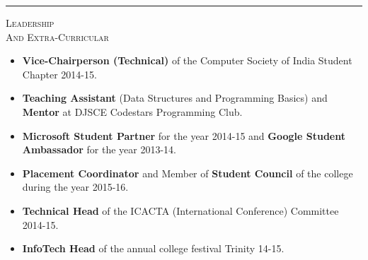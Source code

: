 \documentclass[11pt,a4paper]{article}
\newcommand{\bspace}{\vspace{4.0mm}} %
\begin{document}
	\bspace
	\hrule
	\bspace
	
	\begin{minipage}[t]{0.2\textwidth}
		\textsc{Leadership\\And Extra-Curricular} 
	\end{minipage}
	\begin{minipage}[t]{0.8\textwidth}
		\justify
		\begin{itemize}[noitemsep, leftmargin=*]
			\item \textbf{Vice-Chairperson (Technical)} of the Computer Society of India Student Chapter 2014-15.
			\item \textbf{Teaching Assistant} (Data Structures and Programming Basics) and \textbf{Mentor} at DJSCE Codestars Programming Club.
			\item \textbf{Microsoft Student Partner} for the year 2014-15 and \textbf{Google Student Ambassador} for the year 2013-14.
			\item \textbf{Placement Coordinator} and Member of \textbf{Student Council} of the college during the year 2015-16.
			\item \textbf{Technical Head} of the ICACTA (International Conference) Committee 2014-15.
			\item \textbf{InfoTech Head} of the annual college festival Trinity 14-15.
			
		\end{itemize}
	\end{minipage}
	
	
\end{document}
